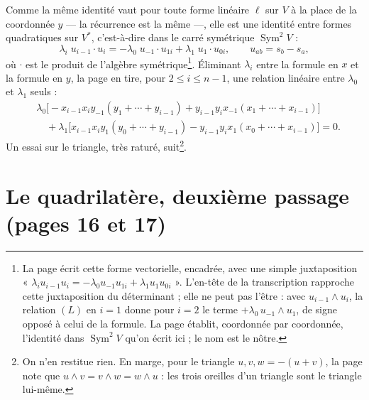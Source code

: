\documentclass[11pt,a4paper]{article}
\begin{document}
Comme la même identité vaut pour toute forme linéaire $\ell$ sur $V$ à la place
de la coordonnée $y$ --- la récurrence est la même ---, elle est une identité
entre formes quadratiques sur $V^*$, c'est-à-dire dans le carré symétrique
$\operatorname{Sym}^2 V$ :
\[
  \lambda_i \; u_{i-1} \cdot u_i
  = -\lambda_0 \; u_{-1} \cdot u_{1i} + \lambda_1 \; u_1 \cdot u_{0i} ,
  \qquad u_{ab} = s_b - s_a ,
\]
où $\cdot$ est le produit de l'algèbre symétrique\footnote{La page écrit cette
forme vectorielle, encadrée, avec une simple juxtaposition
« $\lambda_i u_{i-1} u_i = -\lambda_0 u_{-1} u_{1i} + \lambda_1 u_1 u_{0i}$ ».
L'en-tête de la transcription rapproche cette juxtaposition du déterminant ;
elle ne peut pas l'être : avec $u_{i-1} \wedge u_i$, la relation $(L)$ en
$i = 1$ donne pour $i = 2$ le terme $+\lambda_0\, u_{-1} \wedge u_1$, de signe
opposé à celui de la formule. La page établit, coordonnée par
coordonnée, l'identité dans $\operatorname{Sym}^2 V$ qu'on écrit ici ; le
nom est le nôtre.}. Éliminant $\lambda_i$ entre la formule en $x$ et la formule
en $y$, la page en tire, pour $2 \leqslant i \leqslant n-1$, une relation
linéaire entre $\lambda_0$ et $\lambda_1$ seuls :
\begin{align*}
  &\lambda_0 \bigl[ -x_{i-1} x_i y_{-1} (y_1 + \cdots + y_{i-1})
  + y_{i-1} y_i x_{-1} (x_1 + \cdots + x_{i-1}) \bigr] \\
  &\quad + \lambda_1 \bigl[ x_{i-1} x_i y_1 (y_0 + \cdots + y_{i-1})
  - y_{i-1} y_i x_1 (x_0 + \cdots + x_{i-1}) \bigr] = 0 .
\end{align*}
Un essai sur le triangle, très raturé, suit\footnote{On n'en restitue rien. En
marge, pour le triangle $u, v, w = -(u+v)$, la page note que
$u \wedge v = v \wedge w = w \wedge u$ : les trois oreilles d'un triangle sont
le triangle lui-même.}.

\section*{Le quadrilatère, deuxième passage (pages 16 et 17)}
\end{document}
